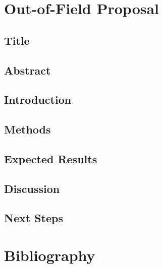 \documentclass[12pt]{article}
\begin{document}
\newpage
\section{Out-of-Field Proposal}
\subsection*{Title}

\begin{doublespacing}
\subsection{Abstract}


\subsection{Introduction}



\subsection{Methods}





\subsection{Expected Results}


\subsection{Discussion}


\subsection{Next Steps}




\end{doublespacing}

\newpage
\section{Bibliography}


\end{document}
